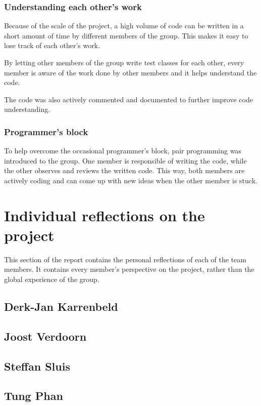 \documentclass[10pt,a4paper]{report}
\begin{document}
			\subsubsection*{Understanding each other's work}
				Because of the scale of the project, a high volume of code can be written in a short amount of time by different members of the group. This makes it easy to lose track of each other's work. 
				
				By letting other members of the group write test classes for each other, every member is aware of the work done by other members and it helps understand the code. 
				
				The code was also actively commented and documented to further improve code understanding.
			\subsubsection*{Programmer's block}
				To help overcome the occasional programmer's block, pair programming was introduced to the group. One member is responsible of writing the code, while the other observes and reviews the written code. This way, both members are actively coding and can come up with new ideas when the other member is stuck.

	\section{Individual reflections on the project}
		This section of the report contains the personal reflections of each of the team members. It contains every member's perspective on the project, rather than the global experience of the group.
		\subsection{Derk-Jan Karrenbeld}
			
			\clearpage
		\subsection{Joost Verdoorn}
			
			\clearpage
		\subsection{Steffan Sluis}
			
			\clearpage
		\subsection{Tung Phan}
			
			\clearpage
\end{document}
